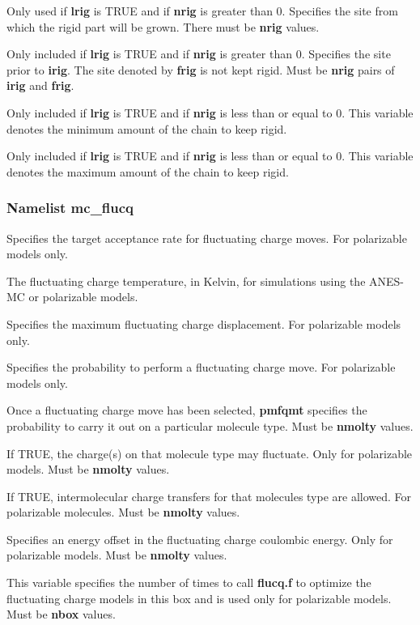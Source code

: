 \documentclass[12pt,letterpaper]{article}
\begin{document}
 Only used if {\bf lrig} is TRUE and if
{\bf nrig} is greater than 0. Specifies the site from which
the rigid part will be grown. There must be \textbf{nrig}
values.

 Only included if {\bf lrig} is TRUE and
if {\bf nrig} is greater than 0. Specifies the site prior to
{\bf irig}. The site denoted by {\bf frig} is not kept
rigid. Must be {\bf nrig} pairs of {\bf irig} and {\bf
  frig}.

 Only included if {\bf lrig} is TRUE
and if {\bf nrig} is less than or equal to 0. This variable
denotes the minimum amount of the chain to keep rigid.

 Only included if {\bf lrig} is TRUE
and if {\bf nrig} is less than or equal to 0. This variable
denotes the maximum amount of the chain to keep rigid.

\subsubsection{Namelist \textbf{mc\_flucq}}
 Specifies the target acceptance rate
for fluctuating charge moves. For polarizable models only.

 The fluctuating charge temperature,
in Kelvin, for simulations using the ANES-MC or polarizable
models.

 Specifies the maximum fluctuating
charge displacement. For polarizable models only.

 Specifies the probability to perform
a fluctuating charge move. For polarizable models only.

 Once a fluctuating charge move has
been selected, {\bf pmfqmt} specifies the probability to
carry it out on a particular molecule type. Must be {\bf
  nmolty} values.

 If TRUE, the charge(s) on that
molecule type may fluctuate. Only for polarizable models.
Must be {\bf nmolty} values.

 If TRUE, intermolecular charge
transfers for that molecules type are allowed. For
polarizable molecules. Must be {\bf nmolty} values.

 Specifies an energy offset in the
fluctuating charge coulombic energy. Only for polarizable
models. Must be {\bf nmolty} values.

 This variable specifies the number of
times to call {\bf flucq.f} to optimize the fluctuating
charge models in this box and is used only for polarizable
models. Must be {\bf nbox} values.
\end{document}
